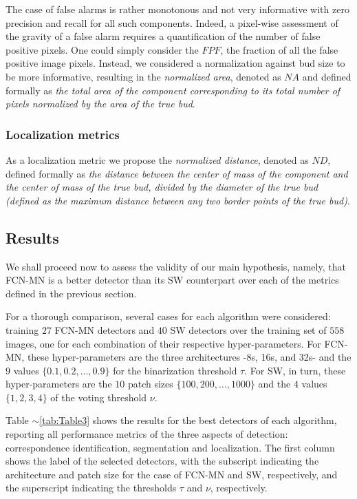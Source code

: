 \documentclass[a4paper,authoryear,review]{elsarticle}
\begin{document}
	The case of false alarms is rather monotonous and not very informative with zero precision and recall for all such components. Indeed, a pixel-wise assessment of the gravity of a false alarm requires a quantification of the number of false positive pixels. One could simply consider the $FPF$, the fraction of all the false positive image pixels. Instead, we considered a normalization against bud size to be more informative, resulting in the \emph{normalized area}, denoted as $NA$ and defined formally as \emph{the total area of the component corresponding to its total number of pixels normalized by the area of the true bud}. 
	
	\subsubsection{Localization metrics}
	\label{subsec:locmetrics}
	
	As a localization metric we propose the \emph{normalized distance}, denoted as $ND$, defined formally as \emph{the distance between the center of mass of the component and the center of mass of the true bud, divided by the diameter of the true bud (defined as the maximum distance between any two border points of the true bud)}.
	
	\subsection{Results}
	\label{sec:resultados}
	
	We shall proceed now to assess the validity of our main hypothesis, namely, that FCN-MN is a better detector than its SW counterpart over each of the metrics defined in the previous section. 
	
	For a thorough comparison, several cases for each algorithm  were considered: training $27$ FCN-MN detectors and $40$ SW detectors over the training set of $558$ images, one for each combination of their respective hyper-parameters. For FCN-MN, these hyper-parameters are the three architectures -8s, 16s, and 32s- and the $9$ values $\{0.1, 0.2, \ldots, 0.9\}$ for the binarization threshold $\tau$. For SW, in turn, these hyper-parameters are the $10$ patch sizes $\{100, 200, \ldots, 1000\}$  and the $4$ values $\{1, 2, 3, 4\}$  of the voting threshold $\nu$.
	
	Table $\sim$\ref{tab:Table3} shows the results for the best detectors of each algorithm, reporting all performance metrics of the three aspects of detection: correspondence identification, segmentation and localization. The first column shows the label of the selected detectors, with the subscript indicating the architecture and patch size for the case of FCN-MN and SW, respectively, and the superscript indicating the thresholds $\tau$ and $\nu$, respectively.
	
\end{document}
